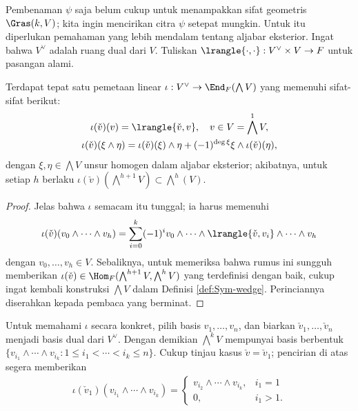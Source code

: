 Pembenaman $\psi$ saja belum cukup untuk menampakkan sifat geometris $\Gras(k, V)$; kita ingin mencirikan citra $\psi$ setepat mungkin. Untuk itu diperlukan pemahaman yang lebih mendalam tentang aljabar eksterior. Ingat bahwa $V^\vee$ adalah ruang dual dari $V$. Tuliskan $\lrangle{\cdot, \cdot}: V^\vee \times V \to F$ untuk pasangan alami.
\begin{definition-theorem}\label{def:wedge-contraction}
	Terdapat tepat satu pemetaan linear $\iota: V^\vee \to \End_F( \bigwedge V)$ yang memenuhi sifat-sifat berikut:
	\begin{gather*}
		\iota(\check{v})(v) = \lrangle{\check{v}, v}, \quad v \in V = \bigwedge^1 V, \\
		\iota(\check{v})(\xi \wedge \eta) = \iota(\check{v})(\xi) \wedge \eta + (-1)^{\deg \xi} \xi \wedge \iota(\check{v})(\eta),
	\end{gather*}
	dengan $\xi, \eta \in \bigwedge V$ unsur homogen dalam aljabar eksterior; akibatnya, untuk setiap $h$ berlaku $\iota(\check{v})(\bigwedge^{h+1} V) \subset \bigwedge^h(V)$.
\end{definition-theorem}
\begin{proof}
	Jelas bahwa $\iota$ semacam itu tunggal; ia harus memenuhi
	\[ \iota(\check{v})(v_0 \wedge \cdots \wedge v_h) = \sum_{i=0}^k (-1)^i v_0 \wedge \cdots \wedge \lrangle{\check{v}, v_i} \wedge \cdots \wedge v_h \]
	dengan $v_0, \ldots, v_h \in V$. Sebaliknya, untuk memeriksa bahwa rumus ini sungguh memberikan $\iota(\check{v}) \in \Hom_F( \bigwedge^{h+1} V, \bigwedge^h V)$ yang terdefinisi dengan baik, cukup ingat kembali konstruksi $\bigwedge V$ dalam Definisi \ref{def:Sym-wedge}. Perinciannya diserahkan kepada pembaca yang berminat.
\end{proof}
Untuk memahami $\iota$ secara konkret, pilih basis $v_1, \ldots, v_n$, dan biarkan $\check{v}_1, \ldots, \check{v}_n$ menjadi basis dual dari $V^\vee$. Dengan demikian $\bigwedge^k V$ mempunyai basis berbentuk $\{ v_{i_1} \wedge \cdots \wedge v_{i_k}: 1 \leq i_1 < \cdots < i_k \leq n \}$. Cukup tinjau kasus $\check{v} = \check{v}_1$; pencirian di atas segera memberikan
\begin{gather}\label{eqn:contraction-concrete}
	\iota(\check{v}_1)(v_{i_1} \wedge \cdots \wedge v_{i_k}) = \begin{cases}
		v_{i_2} \wedge \cdots \wedge v_{i_k}, & i_1 = 1 \\
		0, & i_1 > 1. 
\end{cases}\end{gather}
